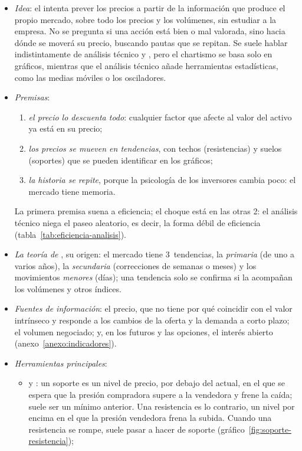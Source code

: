 \documentclass[11pt]{article}
\begin{document}
\begin{itemize}
\item \emph{Idea}: el  intenta prever los precios a partir de la información que produce el propio mercado, sobre todo los precios y los volúmenes, sin estudiar a la empresa. No se pregunta si una acción está bien o mal valorada, sino hacia dónde se moverá su precio, buscando pautas que se repitan. Se suele hablar indistintamente de análisis técnico y , pero el chartismo se basa solo en gráficos, mientras que el análisis técnico añade herramientas estadísticas, como las medias móviles o los osciladores.
\item \emph{Premisas}\nocite{Murphy1999Technical}:
  \begin{enumerate}
  \item \emph{el precio lo descuenta todo}: cualquier factor que afecte al valor del activo ya está en su precio;
  \item \emph{los precios se mueven en tendencias}, con techos (resistencias) y suelos (soportes) que se pueden identificar en los gráficos;
  \item \emph{la historia se repite}, porque la psicología de los inversores cambia poco: el mercado tiene memoria.
  \end{enumerate}
  La primera premisa suena a eficiencia; el choque está en las otras 2: el análisis técnico niega el paseo aleatorio, es decir, la forma débil de eficiencia (tabla~\ref{tab:eficiencia-analisis}).
\item \emph{La teoría de }, su origen: el mercado tiene 3~tendencias, la \emph{primaria} (de uno a varios años), la \emph{secundaria} (correcciones de semanas o meses) y los movimientos \emph{menores} (días); una tendencia solo se confirma si la acompañan los volúmenes y otros índices\nocite{Murphy1999Technical}.
\item \emph{Fuentes de información}: el precio, que no tiene por qué coincidir con el valor intrínseco y responde a los cambios de la oferta y la demanda a corto plazo; el volumen negociado; y, en los futuros y las opciones, el interés abierto (anexo~\ref{anexo:indicadores}).
\item \emph{Herramientas principales}:
  \begin{itemize}
  \item {} y : un soporte es un nivel de precio, por debajo del actual, en el que se espera que la presión compradora supere a la vendedora y frene la caída; suele ser un mínimo anterior. Una resistencia es lo contrario, un nivel por encima en el que la presión vendedora frena la subida. Cuando una resistencia se rompe, suele pasar a hacer de soporte (gráfico~\ref{fig:soporte-resistencia});

\end{itemize}
\end{itemize}
\end{document}
